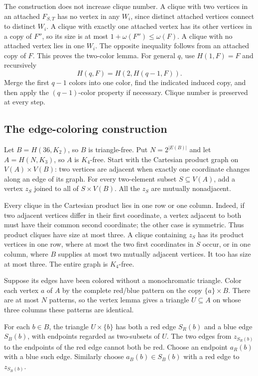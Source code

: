 The construction does not increase clique number. A clique with two vertices in an attached $F_{S,T}$ has no vertex in any $W_i$, since distinct attached vertices connect to distinct $W_i$. A clique with exactly one attached vertex has its other vertices in a copy of $F''$, so its size is at most $1+\omega(F'')\leq\omega(F)$. A clique with no attached vertex lies in one $W_i$. The opposite inequality follows from an attached copy of $F$. This proves the two-color lemma. For general $q$, use $H(1,F)=F$ and recursively
\[H(q,F)=H(2,H(q-1,F)).\]
Merge the first $q-1$ colors into one color, find the indicated induced copy, and then apply the $(q-1)$-color property if necessary. Clique number is preserved at every step.

\subsection*{The edge-coloring construction}
Let $B=H(36,K_2)$, so $B$ is triangle-free. Put $N=2^{|E(B)|}$ and let $A=H(N,K_3)$, so $A$ is $K_4$-free. Start with the Cartesian product graph on $V(A)\times V(B)$: two vertices are adjacent when exactly one coordinate changes along an edge of its graph. For every two-element subset $S\subseteq V(A)$, add a vertex $z_S$ joined to all of $S\times V(B)$. All the $z_S$ are mutually nonadjacent.

Every clique in the Cartesian product lies in one row or one column. Indeed, if two adjacent vertices differ in their first coordinate, a vertex adjacent to both must have their common second coordinate; the other case is symmetric. Thus product cliques have size at most three. A clique containing $z_S$ has its product vertices in one row, where at most the two first coordinates in $S$ occur, or in one column, where $B$ supplies at most two mutually adjacent vertices. It too has size at most three. The entire graph is $K_4$-free.

Suppose its edges have been colored without a monochromatic triangle. Color each vertex $a$ of $A$ by the complete red/blue pattern on the copy $\{a\}\times B$. There are at most $N$ patterns, so the vertex lemma gives a triangle $U\subseteq A$ on whose three columns these patterns are identical.

For each $b\in B$, the triangle $U\times\{b\}$ has both a red edge $S_R(b)$ and a blue edge $S_B(b)$, with endpoints regarded as two-subsets of $U$. The two edges from $z_{S_R(b)}$ to the endpoints of the red edge cannot both be red. Choose an endpoint $a_R(b)$ with a blue such edge. Similarly choose $a_B(b)\in S_B(b)$ with a red edge to $z_{S_B(b)}$.

